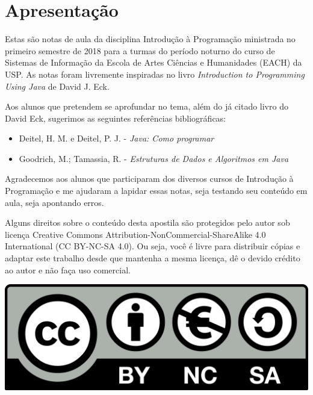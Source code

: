 \chapter*{Apresentação}

Estas são notas de aula da disciplina Introdução à Programação ministrada no primeiro semestre de 2018 para a turmas do período noturno do curso de Sistemas de Informação da Escola de Artes Ciências e Humanidades (EACH) da USP.
As notas foram livremente inspiradas no livro {\em Introduction to Programming Using Java} de David J. Eck.

Aos alunos que pretendem se aprofundar no tema, além do já citado livro do David Eck, sugerimos as seguintes referências bibliográficas:

\begin{itemize}
\item Deitel, H. M. e Deitel, P. J. - {\em Java: Como programar}
\item Goodrich, M.; Tamassia, R. - {\em Estruturas de Dados e Algoritmos em Java}
\end{itemize}

Agradecemos aos alunos que participaram dos diversos cursos de Introdução à Programação e me ajudaram a lapidar essas notas, seja testando seu conteúdo em aula, seja apontando erros. 

Alguns direitos sobre o conteúdo desta apostila são protegidos pelo autor sob licença Creative Commons
Attribution-NonCommercial-ShareAlike 4.0 International (CC BY-NC-SA 4.0). Ou seja, você  é livre para distribuir cópias e adaptar este trabalho desde que mantenha a mesma licença, dê o devido crédito ao autor e não faça uso comercial.

\begin{center}
  \includegraphics[width=.3\textwidth]{imagens/cc.png}
\end{center}